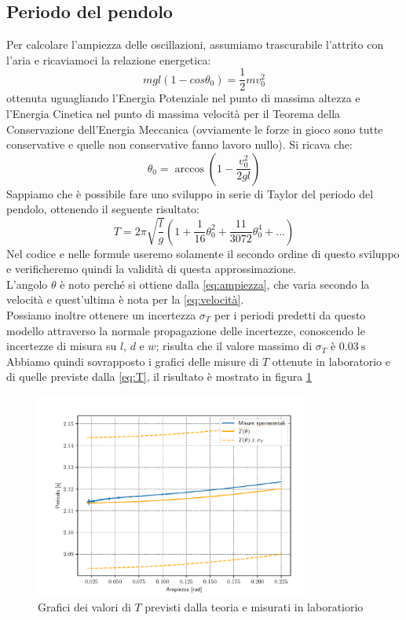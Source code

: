 \documentclass{article}
\begin{document}
    \subsection{Periodo del pendolo}
    Per calcolare l'ampiezza delle oscillazioni, assumiamo trascurabile l'attrito con l'aria e ricaviamoci la relazione energetica:
    \begin{equation}
        mgl(1-cos\theta_0) = \frac{1}{2}m v_0^2
    \end{equation}
    ottenuta uguagliando l'Energia Potenziale nel punto di massima altezza e l'Energia Cinetica nel punto di massima velocità per il Teorema della Conservazione dell'Energia Meccanica (ovviamente le forze in gioco sono tutte conservative e quelle non conservative fanno lavoro nullo). Si ricava che:
    \begin{equation}\label{eq:ampiezza}
        \theta_0 = \arccos\left(1 -\frac{v_0^2}{2gl}\right)
    \end{equation}
    Sappiamo che è possibile fare uno sviluppo in serie di Taylor del periodo del pendolo, ottenendo il seguente risultato:
    \begin{equation}\label{eq:T}
        T = 2 \pi \sqrt{\frac{l}{g}}\left(1 + \frac{1}{16}\theta_0^2 + \frac{11}{3072}\theta_0^4 + ...\right)
    \end{equation}
    Nel codice e nelle formule useremo solamente il secondo ordine di questo sviluppo e verificheremo
    quindi la validità di questa approssimazione.\\
    L'angolo $\theta$ è noto perché si ottiene dalla \ref{eq:ampiezza}, che varia secondo la velocità e quest'ultima è nota per la \ref{eq:velocità}.\\
    Possiamo inoltre ottenere un incertezza $\sigma_T$ per i periodi predetti
    da questo modello attraverso la normale propagazione delle incertezze, conoscendo le
    incertezze di misura su $l$, $d$ e $w$; risulta che il valore massimo di $\sigma_T$ è $\SI{0.03}{\s}$\\
    Abbiamo quindi sovrapposto i grafici delle misure di $T$ ottenute in laboratorio e di
    quelle previste dalla \ref{eq:T}, il risultato è mostrato in figura \ref{fig:pendolo_quadrifilare_periodo}
    \begin{figure}[ht!]
        \centering
        \includegraphics[width=0.8\textwidth]{extra/pendolo_quadrifilare_periodo.pdf}
        \caption{Grafici dei valori di $T$ previsti dalla teoria e misurati in laboratiorio}
        \label{fig:pendolo_quadrifilare_periodo}
    \end{figure}
\end{document}
